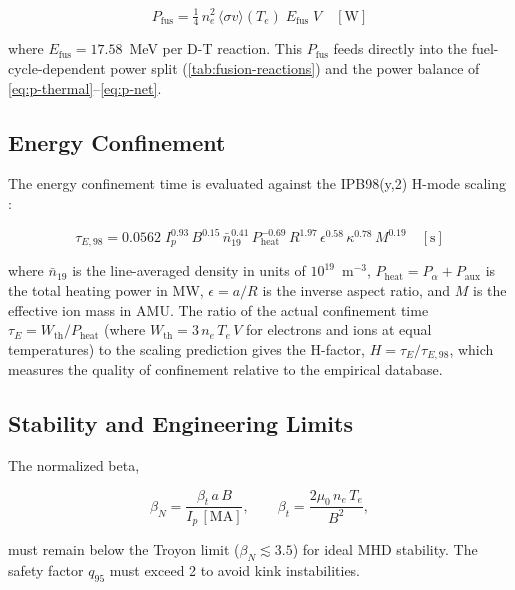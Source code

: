 \documentclass{article}
\begin{document}
\begin{equation}
\label{eq:pfus-tokamak}
P_{\text{fus}} = \tfrac{1}{4}\,n_e^2\,
  \langle\sigma v\rangle(T_e)\;E_{\text{fus}}\;V
  \quad [\text{W}]
\end{equation}

\noindent where $E_{\text{fus}} = 17.58$~MeV per D-T reaction.
This $P_{\text{fus}}$ feeds directly into the fuel-cycle-dependent
power split (\cref{tab:fusion-reactions}) and the power balance
of \cref{eq:p-thermal}--\cref{eq:p-net}.

\subsection{Energy Confinement}

The energy confinement time is evaluated against the IPB98(y,2)
H-mode scaling \citep{iterphysics1999}:

\begin{equation}
\label{eq:ipb98y2}
\tau_{E,98} = 0.0562\;
  I_p^{0.93}\,B^{0.15}\,\bar{n}_{19}^{0.41}\,
  P_{\text{heat}}^{-0.69}\,R^{1.97}\,\epsilon^{0.58}\,
  \kappa^{0.78}\,M^{0.19}
  \quad [\text{s}]
\end{equation}

\noindent where $\bar{n}_{19}$ is the line-averaged density in units of
$10^{19}$~m$^{-3}$, $P_{\text{heat}} = P_\alpha + P_{\text{aux}}$ is
the total heating power in MW, $\epsilon = a/R$ is the inverse aspect
ratio, and $M$ is the effective ion mass in AMU. The ratio of the
actual confinement time $\tau_E = W_{\text{th}} / P_{\text{heat}}$
(where $W_{\text{th}} = 3\,n_e\,T_e\,V$ for electrons and ions at
equal temperatures) to the scaling prediction gives the H-factor,
$H = \tau_E / \tau_{E,98}$, which measures the quality of confinement
relative to the empirical database.

\subsection{Stability and Engineering Limits}

The normalized beta,

\begin{equation}
\label{eq:beta-n}
\beta_N = \frac{\beta_t\,a\,B}{I_p\,[\text{MA}]},
\qquad
\beta_t = \frac{2\mu_0\,n_e\,T_e}{B^2},
\end{equation}

\noindent must remain below the Troyon limit ($\beta_N \lesssim 3.5$)
for ideal MHD stability. The safety factor $q_{95}$ must exceed
2 to avoid kink instabilities.
\end{document}
